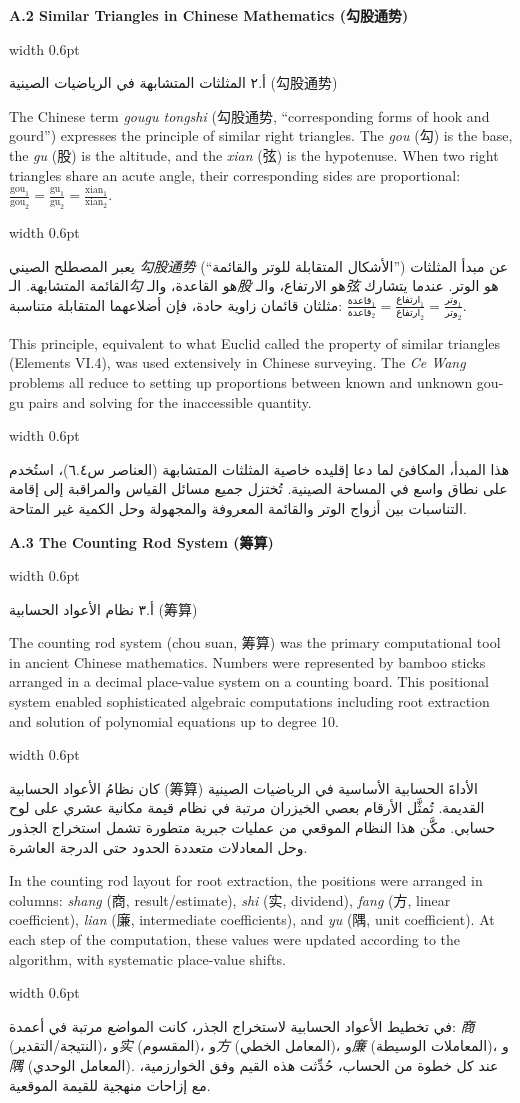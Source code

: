\documentclass[11pt,a4paper]{article}
\newlength{\cnwidth}
\newlength{\arwidth}
\newcommand{\paralleltext}[2]{%
  \par\medskip\noindent
  \begin{minipage}[t]{\cnwidth}%
    \small #1%
  \end{minipage}%
  \hfill\textcolor{colrule}{\vrule width 0.6pt}\hfill
  \begin{minipage}[t]{\arwidth}%
    \small\arabicfont\beginR #2\endR%
  \end{minipage}%
  \par\medskip
}
\newcommand{\parallelsubsection}[2]{%
  \par\medskip\noindent
  \begin{minipage}[t]{\cnwidth}%
    \large\bfseries\color{sectioncolor} #1%
  \end{minipage}%
  \hfill\textcolor{colrule}{\vrule width 0.6pt}\hfill
  \begin{minipage}[t]{\arwidth}%
    \large\arabicfontbf\color{sectioncolor}\beginR #2\endR%
  \end{minipage}%
  \par\smallskip
}
\begin{document}
\parallelsubsection{A.2 Similar Triangles in Chinese Mathematics (勾股通势)}{أ.٢ المثلثات المتشابهة في الرياضيات الصينية (勾股通势)}

\paralleltext{%
The Chinese term \textit{gougu tongshi} (勾股通势, ``corresponding forms of hook and gourd'') expresses the principle of similar right triangles. The \textit{gou} (勾) is the base, the \textit{gu} (股) is the altitude, and the \textit{xian} (弦) is the hypotenuse. When two right triangles share an acute angle, their corresponding sides are proportional: $\frac{\text{gou}_1}{\text{gou}_2} = \frac{\text{gu}_1}{\text{gu}_2} = \frac{\text{xian}_1}{\text{xian}_2}$.
}{%
يعبر المصطلح الصيني \textit{勾股通势} (``الأشكال المتقابلة للوتر والقائمة'') عن مبدأ المثلثات القائمة المتشابهة. الـ\textit{勾} هو القاعدة، والـ\textit{股} هو الارتفاع، والـ\textit{弦} هو الوتر. عندما يتشارك مثلثان قائمان زاوية حادة، فإن أضلاعهما المتقابلة متناسبة: $\frac{\text{قاعدة}_1}{\text{قاعدة}_2} = \frac{\text{ارتفاع}_1}{\text{ارتفاع}_2} = \frac{\text{وتر}_1}{\text{وتر}_2}$.
}

\paralleltext{%
This principle, equivalent to what Euclid called the property of similar triangles (Elements VI.4), was used extensively in Chinese surveying. The \textit{Ce Wang} problems all reduce to setting up proportions between known and unknown gou-gu pairs and solving for the inaccessible quantity.
}{%
هذا المبدأ، المكافئ لما دعا إقليده خاصية المثلثات المتشابهة (العناصر س٦.٤)، استُخدم على نطاق واسع في المساحة الصينية. تُختزل جميع مسائل القياس والمراقبة إلى إقامة التناسبات بين أزواج الوتر والقائمة المعروفة والمجهولة وحل الكمية غير المتاحة.
}

\parallelsubsection{A.3 The Counting Rod System (筹算)}{أ.٣ نظام الأعواد الحسابية (筹算)}

\paralleltext{%
The counting rod system (chou suan, 筹算) was the primary computational tool in ancient Chinese mathematics. Numbers were represented by bamboo sticks arranged in a decimal place-value system on a counting board. This positional system enabled sophisticated algebraic computations including root extraction and solution of polynomial equations up to degree 10.
}{%
كان نظامُ الأعواد الحسابية (筹算) الأداةَ الحسابية الأساسية في الرياضيات الصينية القديمة. تُمثَّل الأرقام بعصي الخيزران مرتبة في نظام قيمة مكانية عشري على لوح حسابي. مكَّن هذا النظام الموقعي من عمليات جبرية متطورة تشمل استخراج الجذور وحل المعادلات متعددة الحدود حتى الدرجة العاشرة.
}

\paralleltext{%
In the counting rod layout for root extraction, the positions were arranged in columns: \textit{shang} (商, result/estimate), \textit{shi} (实, dividend), \textit{fang} (方, linear coefficient), \textit{lian} (廉, intermediate coefficients), and \textit{yu} (隅, unit coefficient). At each step of the computation, these values were updated according to the algorithm, with systematic place-value shifts.
}{%
في تخطيط الأعواد الحسابية لاستخراج الجذر، كانت المواضع مرتبة في أعمدة: \textit{商} (النتيجة/التقدير)، و\textit{实} (المقسوم)، و\textit{方} (المعامل الخطي)، و\textit{廉} (المعاملات الوسيطة)، و\textit{隅} (المعامل الوحدي). عند كل خطوة من الحساب، حُدِّثت هذه القيم وفق الخوارزمية، مع إزاحات منهجية للقيمة الموقعية.
}
\end{document}
